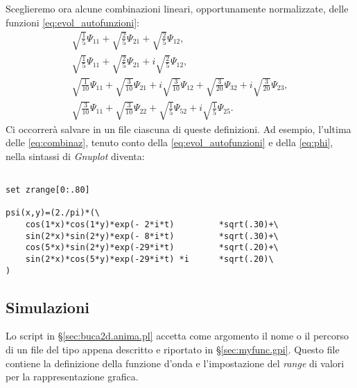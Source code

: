 Sceglieremo ora alcune combinazioni lineari, opportunamente normalizzate,
delle funzioni \eqref{eq:evol_autofunzioni}:
\begin{subequations}\label{eq:combinaz}\begin{gather}
    \sqrt{\frac{1}{ 5}}\Psi_{11}  + 
    \sqrt{\frac{2}{ 5}}\Psi_{21}  + 
    \sqrt{\frac{2}{ 5}}\Psi_{12}  , \label{eq:comb1} 
  \\
    \sqrt{\frac{1}{ 5}}\Psi_{11}  + 
    \sqrt{\frac{2}{ 5}}\Psi_{21}  + 
  i \sqrt{\frac{2}{ 5}}\Psi_{12}  , \label{eq:comb2} 
  \\
    \sqrt{\frac{1}{10}}\Psi_{11}  + 
    \sqrt{\frac{3}{10}}\Psi_{21}  + 
  i \sqrt{\frac{3}{10}}\Psi_{12}  +
    \sqrt{\frac{3}{20}}\Psi_{32}  + 
  i \sqrt{\frac{3}{20}}\Psi_{23}  , \label{eq:comb3}  
  \\
    \sqrt{\frac{3}{10}}\Psi_{11}  + 
    \sqrt{\frac{3}{10}}\Psi_{22}  + 
    \sqrt{\frac{1}{ 5}}\Psi_{52}  +
  i \sqrt{\frac{1}{ 5}}\Psi_{25}  . \label{eq:comb4}
\end{gather}\end{subequations} 
%
Ci occorrerà salvare in un file ciascuna
di queste definizioni. Ad esempio, l'ultima delle \eqref{eq:combinaz}, 
tenuto conto della \eqref{eq:evol_autofunzioni} e della \eqref{eq:phi}, 
nella sintassi di \emph{Gnuplot}\cite{GNUPLOT} diventa:
\begin{lstlisting}

set zrange[0:.80]

psi(x,y)=(2./pi)*(\
    cos(1*x)*cos(1*y)*exp(- 2*i*t)         *sqrt(.30)+\
    sin(2*x)*sin(2*y)*exp(- 8*i*t)         *sqrt(.30)+\
    cos(5*x)*sin(2*y)*exp(-29*i*t)         *sqrt(.20)+\
    sin(2*x)*cos(5*y)*exp(-29*i*t) *i      *sqrt(.20)\
)

\end{lstlisting}

\subsection{Simulazioni}

Lo script in \S\ref{sec:buca2d.anima.pl} accetta come argomento
il nome o il percorso di un file del tipo appena descritto
e riportato in \S\ref{sec:myfunc.gpi}. Questo file
contiene la definizione della funzione d'onda e l'impostazione
del \emph{range} di valori per la rappresentazione grafica. 

